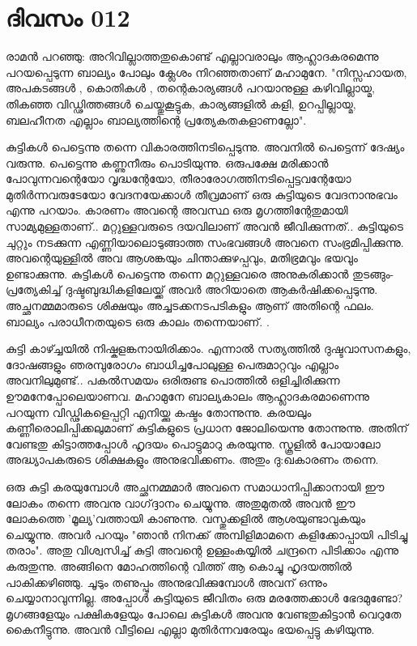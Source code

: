  
\section{ദിവസം 012}


രാമന്‍ പറഞ്ഞു: അറിവില്ലാത്തതുകൊണ്ട്‌ എല്ലാവരാലും ആഹ്ലാദകരമെന്നു പറയപ്പെടുന്ന ബാല്യം പോലും ക്ലേശം നിറഞ്ഞതാണ്‌ മഹാമുനേ. "നിസ്സഹായത, അപകടങ്ങള്‍ , കൊതികള്‍ , തന്റെകാര്യങ്ങള്‍ പറയാനുള്ള കഴിവില്ലായ്മ, തികഞ്ഞ വിഡ്ഢിത്തങ്ങള്‍ ചെയ്തുകൂട്ടുക, കാര്യങ്ങളില്‍ കളി, ഉറപ്പില്ലായ്മ, ബലഹീനത എല്ലാം ബാല്യത്തിന്റെ പ്രത്യേകതകളാണല്ലോ". 

കുട്ടികള്‍ പെട്ടെന്നു തന്നെ വികാരത്തിനടിപ്പെടുന്നു. അവനില്‍ പെട്ടെന്ന് ദേഷ്യം വരുന്നു. പെട്ടെന്നു കണ്ണുനീരും പൊടിയുന്നു. ഒരുപക്ഷേ മരിക്കാന്‍ പോവുന്നവന്റെയോ വൃദ്ധന്റേയോ, തീരാരോഗത്തിനടിപ്പെട്ടവന്റേയോ മുതിര്‍ന്നവരുടേയോ വേദനയേക്കാള്‍ തീവ്രമാണ്‌ ഒരു കുട്ടിയുടെ വേദനാനുഭവം എന്നു പറയാം. കാരണം അവന്റെ അവസ്ഥ ഒരു മൃഗത്തിന്റേതുമായി സാമ്യമുള്ളതാണ്‌.. മറ്റുള്ളവരുടെ ദയവിലാണ്‌ അവന്‍ ജീവിക്കുന്നത്‌.. കുട്ടിയുടെ ചുറ്റും നടക്കുന്ന എണ്ണിയാലൊടുങ്ങാത്ത സംഭവങ്ങള്‍ അവനെ സംഭ്രമിപ്പിക്കുന്നു. അവന്റെയുള്ളില്‍ അവ ആശങ്കയും ചിന്താക്കുഴപ്പവും, മതിഭ്രമവും ഭയവും ഉണ്ടാക്കുന്നു. കുട്ടികള്‍ പെട്ടെന്നു തന്നെ മറ്റുള്ളവരെ അനുകരിക്കാന്‍ തുടങ്ങും- പ്രത്യേകിച്ച്‌ ദുഷ്ടബുദ്ധികളിലേയ്ക്ക്‌ അവര്‍ അറിയാതെ ആകര്‍ഷിക്കപ്പെടുന്നു. അച്ഛനമ്മമാരുടെ ശിക്ഷയും അച്ചടക്കനടപടികളും ആണ്‌ അതിന്റെ ഫലം. ബാല്യം പരാധീനതയുടെ ഒരു കാലം തന്നെയാണ്‌. .

കുട്ടി കാഴ്ച്ചയില്‍ നിഷ്കളങ്കനായിരിക്കാം. എന്നാല്‍ സത്യത്തില്‍ ദുഷ്ടവാസനകളും, ദോഷങ്ങളും ഞരമ്പുരോഗം ബാധിച്ചപോലുള്ള പെരുമാറ്റവും എല്ലാം അവനിലുമുണ്ട്‌.. പകല്‍സമയം ഒരിരുണ്ട പൊത്തില്‍ ഒളിച്ചിരിക്കുന്ന ഊമനേപ്പോലെയാണവ. മഹാമുനേ ബാല്യകാലം ആഹ്ലാദകരമാണെന്നു പറയുന്ന വിഡ്ഢികളെപ്പറ്റി എനിയ്ക്കു കഷ്ടം തോന്നുന്നു. കരയലും കണ്ണീരൊലിപ്പിക്കലുമാണ്‌ കുട്ടികളുടെ പ്രധാന ജോലിയെന്നു തോന്നുന്നു. അതിന്‌ വേണ്ടതു കിട്ടാത്തപ്പോള്‍ ഹൃദയം പൊട്ടുമാറു കരയുന്നു. സ്കൂളില്‍ പോയാലോ അദ്ധ്യാപകരുടെ ശിക്ഷകളും അനുഭവിക്കണം. അതും ദു:ഖകാരണം തന്നെ.

ഒരു കുട്ടി കരയുമ്പോള്‍ അച്ഛനമ്മമാര്‍ അവനെ സമാധാനിപ്പിക്കാനായി ഈ ലോകം തന്നെ അവനു വാഗ്ദ്ദാനം ചെയ്യുന്നു. അതുമുതല്‍ അവന്‍ ഈ ലോകത്തെ 'മൂല്യ'വത്തായി കാണുന്നു. വസ്തുക്കളില്‍ ആശയുണ്ടാവുകയും ചെയ്യുന്നു. അവര്‍ പറയും "ഞാന്‍ നിനക്ക്‌ അമ്പിളിമാമനെ കളിക്കോപ്പായി പിടിച്ചു തരാം". അതു വിശ്വസിച്ച്‌ കുട്ടി അവന്റെ ഉള്ളംകയ്യില്‍ ചന്ദ്രനെ പിടിക്കാം എന്നു കരുതുന്നു. അങ്ങിനെ മോഹത്തിന്റെ വിത്ത്‌ ആ കൊച്ചു ഹൃദയത്തില്‍ പാകിക്കഴിഞ്ഞു. ചൂടും തണുപ്പും അനുഭവിക്കുമ്പോള്‍ അവന്‌ ഒന്നും ചെയ്യാനാവുന്നില്ല. അപ്പോള്‍ കുട്ടിയുടെ ജീവിതം ഒരു മരത്തേക്കാള്‍ ഭേദമുണ്ടോ? മൃഗങ്ങളേയും പക്ഷികളേയും പോലെ കുട്ടികള്‍ അവനു വേണ്ടതുകിട്ടാന്‍ വെറുതേ കൈനീട്ടുന്നു. അവന്‍ വീട്ടിലെ എല്ലാ മുതിര്‍ന്നവരേയും ഭയപ്പെട്ടു കഴിയുന്നു.
